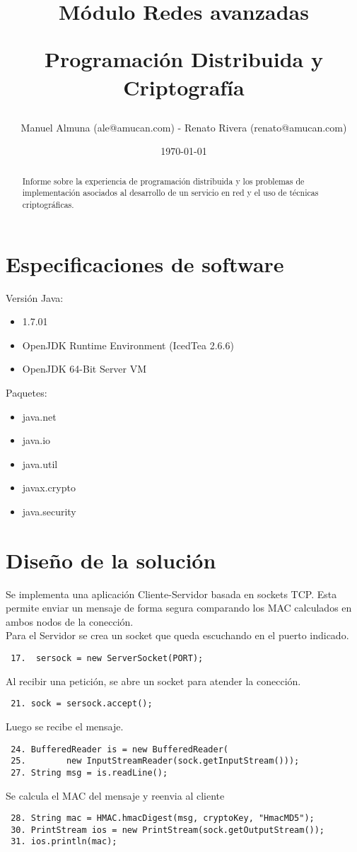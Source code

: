 \documentclass[letter, 10pt]{article}
\begin{document}
\title{Módulo Redes avanzadas \\ \begin{Large}Programación Distribuida y Criptografía\end{Large}}
\author{Manuel Almuna (ale@amucan.com) - Renato Rivera (renato@amucan.com)}
\date{\today}
\maketitle

\begin{abstract}
Informe sobre la experiencia de programación distribuida y 	
los problemas de implementación asociados al desarrollo de un servicio en red y	el	
uso de técnicas criptográficas.

\end{abstract}
\section{Especificaciones de software}
Versión Java: 
\begin{itemize}
 \item 1.7.01
 \item OpenJDK Runtime Environment (IcedTea 2.6.6)
 \item OpenJDK 64-Bit Server VM
\end{itemize}
Paquetes:
\begin{itemize}
 \item java.net
 \item java.io
 \item java.util
 \item javax.crypto
 \item java.security
\end{itemize}


\section{Diseño de la solución}
Se implementa una aplicación Cliente-Servidor basada en sockets TCP. Esta permite enviar un mensaje de forma
segura comparando los MAC calculados en ambos nodos de la conección.
\newline
\\
Para el Servidor se crea un socket que queda escuchando en el puerto indicado.
\begin{verbatim}
 17.  sersock = new ServerSocket(PORT);
\end{verbatim}
Al recibir una petición, se abre un socket para atender la conección.  
\begin{verbatim}
 21. sock = sersock.accept();
\end{verbatim}
Luego se recibe el mensaje.
\begin{verbatim}
 24. BufferedReader is = new BufferedReader(
 25.        new InputStreamReader(sock.getInputStream()));
 27. String msg = is.readLine();
\end{verbatim}
Se calcula el MAC del mensaje y reenvia al cliente
\begin{verbatim}
 28. String mac = HMAC.hmacDigest(msg, cryptoKey, "HmacMD5"); 
 30. PrintStream ios = new PrintStream(sock.getOutputStream());
 31. ios.println(mac);
\end{verbatim}
\end{document}
